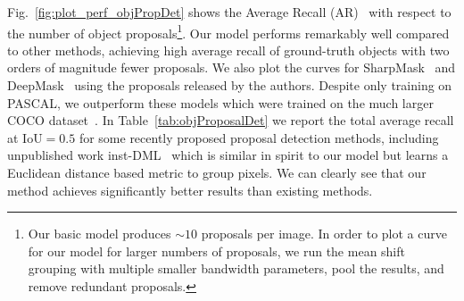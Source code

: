 \documentclass[10pt,twocolumn,letterpaper]{article}
\begin{document}
Fig.~\ref{fig:plot_perf_objPropDet} shows the Average Recall
(AR)~\cite{hosang2016makes} with respect to the number of object
proposals\footnote{Our basic model produces $\sim10$ proposals per image.  In order
to plot a curve for our model for larger numbers of proposals, we run the mean
shift grouping with multiple smaller bandwidth parameters, pool the results,
and remove redundant proposals.}. Our model performs remarkably well compared
to other methods, achieving high average recall of ground-truth objects with two
orders of magnitude fewer proposals.  We also plot the curves for
SharpMask~\cite{pinheiro2015learning} and DeepMask~\cite{pinheiro2016learning}
using the proposals released by the authors. Despite only training on PASCAL,
we outperform these models which were trained on the much larger COCO dataset~\cite{lin2014microsoft}.
In Table~\ref{tab:objProposalDet} we report the total average recall at
IoU$=0.5$ for some recently proposed proposal detection methods, including
unpublished work inst-DML~\cite{fathi2017semantic} which is similar in spirit
to our model but learns a Euclidean distance based metric to group pixels.
We can clearly see that our method achieves significantly better results than
existing methods.
\end{document}
